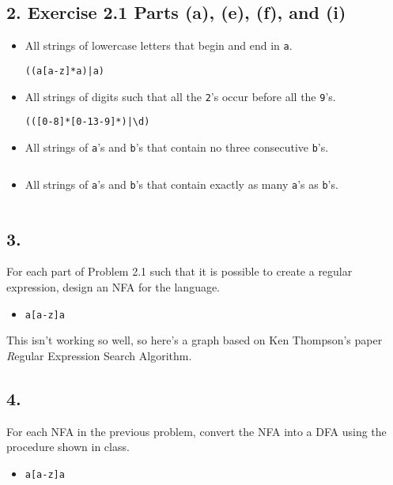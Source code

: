 \documentclass[12pt]{article}
\begin{document}
\subsection*{2. Exercise 2.1 Parts (a), (e), (f), and (i)}
\begin{itemize}
\item[a.] All strings of lowercase letters that begin and end in {\tt a}.
\begin{verbatim}((a[a-z]*a)|a)\end{verbatim}
\item[e.] All strings of digits such that all the {\tt 2}'s occur before all the {\tt 9}'s.
\begin{verbatim}(([0-8]*[0-13-9]*)|\d)\end{verbatim}
\item[f.] All strings of {\tt a}'s and {\tt b}'s that contain no three consecutive {\tt b}'s.
\begin{verbatim}\end{verbatim}
\item[i.] All strings of {\tt a}'s and {\tt b}'s that contain exactly as many {\tt a}'s as {\tt b}'s.
\begin{verbatim}\end{verbatim}
\end{itemize}

\subsection*{3.}
For each part of Problem 2.1 such that it is possible to create a regular expression, design an NFA for the language.
\begin{itemize}
\item[a.] \begin{verbatim}a[a-z]a\end{verbatim}
\end{itemize}
This isn't working so well, so here's a graph based on Ken Thompson's paper {\textit Regular Expression Search Algorithm}.

\subsection*{4.}
For each NFA in the previous problem, convert the NFA into a DFA using the procedure shown in class.
\begin{itemize}
\item[a.] \begin{verbatim}a[a-z]a\end{verbatim}
\end{itemize}
\end{document}
